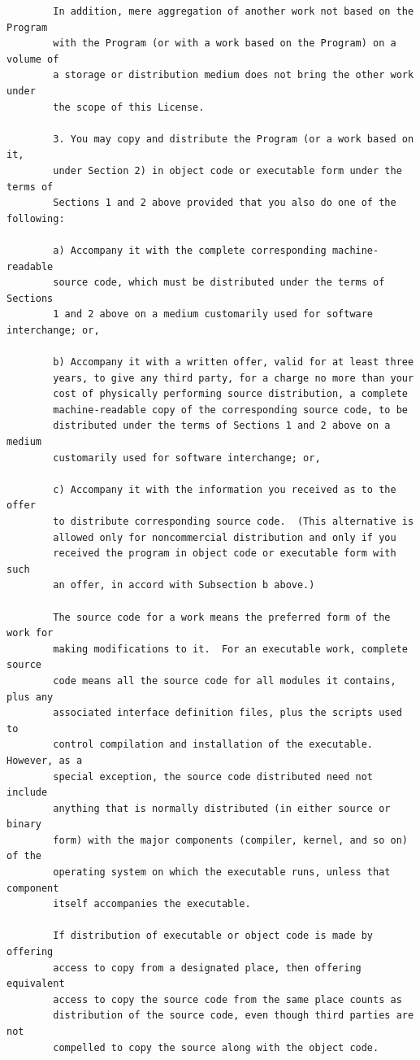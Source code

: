 \documentclass[a4paper,twoside,12pt]{book}
\begin{document}
{\begin{verbatim}
		In addition, mere aggregation of another work not based on the Program
		with the Program (or with a work based on the Program) on a volume of
		a storage or distribution medium does not bring the other work under
		the scope of this License.

		3. You may copy and distribute the Program (or a work based on it,
		under Section 2) in object code or executable form under the terms of
		Sections 1 and 2 above provided that you also do one of the following:

		a) Accompany it with the complete corresponding machine-readable
		source code, which must be distributed under the terms of Sections
		1 and 2 above on a medium customarily used for software interchange; or,

		b) Accompany it with a written offer, valid for at least three
		years, to give any third party, for a charge no more than your
		cost of physically performing source distribution, a complete
		machine-readable copy of the corresponding source code, to be
		distributed under the terms of Sections 1 and 2 above on a medium
		customarily used for software interchange; or,

		c) Accompany it with the information you received as to the offer
		to distribute corresponding source code.  (This alternative is
		allowed only for noncommercial distribution and only if you
		received the program in object code or executable form with such
		an offer, in accord with Subsection b above.)

		The source code for a work means the preferred form of the work for
		making modifications to it.  For an executable work, complete source
		code means all the source code for all modules it contains, plus any
		associated interface definition files, plus the scripts used to
		control compilation and installation of the executable.  However, as a
		special exception, the source code distributed need not include
		anything that is normally distributed (in either source or binary
		form) with the major components (compiler, kernel, and so on) of the
		operating system on which the executable runs, unless that component
		itself accompanies the executable.

		If distribution of executable or object code is made by offering
		access to copy from a designated place, then offering equivalent
		access to copy the source code from the same place counts as
		distribution of the source code, even though third parties are not
		compelled to copy the source along with the object code.


\end{verbatim}}
\end{document}
